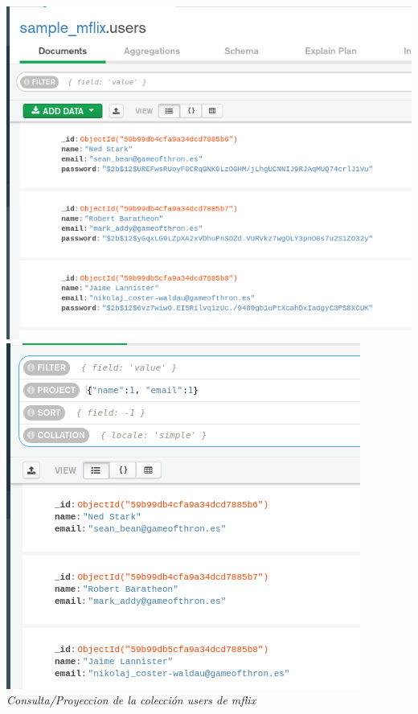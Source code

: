 \documentclass[10pt]{article}
\begin{document}
\begin{center}
  \includegraphics[scale=0.35]{imgs/ej1_3.png}\\
  \includegraphics[scale=0.35]{imgs/ej1_4.png}\\
  \textit{Consulta/Proyeccion de la colección users de mflix}

\end{center}
\end{document}
